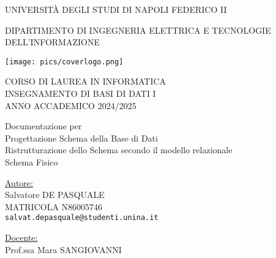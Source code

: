 \documentclass[a4paper, 12pt]{article}
\begin{document}
\begin{titlepage}
    {
        \centering      %
        \scshape        %
        
        {\large {\LARGE U}NIVERSITÀ DEGLI STUDI DI {\LARGE N}APOLI {\LARGE F}EDERICO II\par}
        \vspace{0.25cm}
    
        {\small DIPARTIMENTO DI INGEGNERIA ELETTRICA E TECNOLOGIE DELL'INFORMAZIONE\par}
    }

    \vspace{1cm} 

    \centering
    {
    \texttt{[image: pics/coverlogo.png]}
    }

    \vspace{1cm}

    {
        \scshape
        CORSO DI LAUREA IN INFORMATICA \\[0.5cm]
        INSEGNAMENTO DI BASI DI DATI I \\[0.5cm]
        ANNO ACCADEMICO 2024/2025 \\
    }

    \vfill

    {
        \centering 
        \Large\bfseries
        
        Documentazione per \\[1cm]
        Progettazione Schema della Base di Dati \\[0.5cm]
        Ristrutturazione dello Schema secondo il modello relazionale \\[0.5cm]
        Schema Fisico
    }

    \vfill 

    \begin{minipage}[t]{0.4\textwidth}
        \flushleft 
        \underline{Autore:}\\[0.3cm]
        Salvatore DE PASQUALE \\
        MATRICOLA N86005746 \\
        \texttt{salvat.depasquale@studenti.unina.it} \\[0.5cm]
    \end{minipage}
    \hfill 
    \begin{minipage}[t]{0.4\textwidth}
        \flushleft 
        \underline{Docente:}\\[0.3cm]
        Prof.ssa Mara SANGIOVANNI
    \end{minipage}

\end{titlepage}
\end{document}
